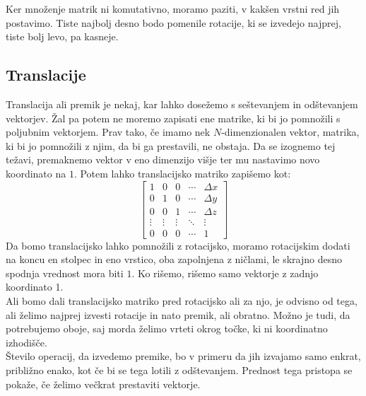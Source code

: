 \documentclass[a4paper, 12px]{article}
\begin{document}
    Ker množenje matrik ni komutativno, moramo paziti, v kakšen vrstni red jih postavimo. Tiste najbolj desno
    bodo pomenile rotacije, ki se izvedejo najprej, tiste bolj levo, pa kasneje.\cite{3D-projection}

\subsection{Translacije}
    Translacija ali premik je nekaj, kar lahko dosežemo s seštevanjem in odštevanjem vektorjev.
    Žal pa potem ne moremo zapisati ene matrike, ki bi jo pomnožili s poljubnim vektorjem.
    Prav tako, če imamo nek $N$-dimenzionalen vektor, matrika, ki bi jo pomnožili z njim, da bi ga prestavili,
    ne obstaja. Da se izognemo tej težavi, premaknemo vektor v eno dimenzijo višje ter mu nastavimo novo koordinato na $1$.
    Potem lahko translacijsko matriko zapišemo kot:
    $$\begin{bmatrix}
        1 & 0 & 0 & \cdots & \Delta x \\
        0 & 1 & 0 & \cdots & \Delta y \\
        0 & 0 & 1 & \cdots & \Delta z \\
        \vdots & \vdots & \vdots & \ddots & \vdots \\
        0 & 0 & 0 & \cdots & 1
    \end{bmatrix}$$
    Da bomo translacijsko lahko pomnožili z rotacijsko, moramo rotacijskim dodati na koncu en stolpec in eno vrstico,
    oba zapolnjena z ničlami, le skrajno desno spodnja vrednost mora biti $1$. Ko rišemo, rišemo samo vektorje z zadnjo koordinato 1.\\

    Ali bomo dali translacijsko matriko pred rotacijsko ali za njo, je odvisno od tega, ali želimo najprej izvesti
    rotacije in nato premik, ali obratno. Možno je tudi, da potrebujemo oboje, saj morda želimo vrteti okrog točke, ki
    ni koordinatno izhodišče.\\

    Število operacij, da izvedemo premike, bo v primeru da jih izvajamo samo enkrat, približno enako, kot če bi se tega 
    lotili z odštevanjem. Prednost tega pristopa se pokaže, če želimo večkrat prestaviti vektorje.\cite{TransformationWiki}
\end{document}
